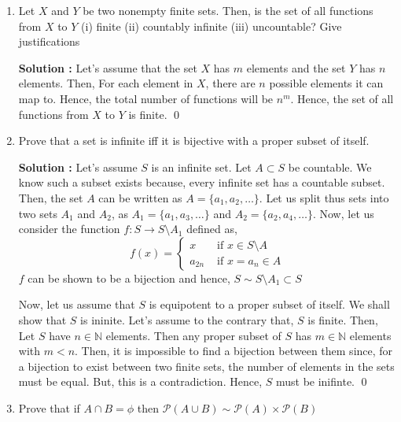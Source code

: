 \documentclass[10pt]{article}
\newcommand{\nn}{\mathbb{N}}
\newcommand{\p}{\mathcal{P}}
\begin{document}
\begin{enumerate}
	    Then, the collection of all decreasing functions from $\nn$ to $\nn$
	    $$ A = \bigcup_{n \in \nn}A_n$$
	    is the countable of union of countable sets and hence countable. \qed


    \item Let $X$ and $Y$ be two nonempty finite sets. Then, is the set of all functions from $X$ to $Y$ (i) finite (ii) countably infinite (iii) uncountable? Give justifications

	    \textbf{Solution : }Let's assume that the set $X$ has $m$ elements and the set $Y$ has $n$ elements. Then, For each element in $X$, there are $n$ possible elements it can map to. Hence, the total number of functions will be $n^m$. Hence, the set of all functions from $X$ to $Y$ is finite. \qed
    \item Prove that a set is infinite iff it is bijective with a proper subset of itself.

	    \textbf{Solution : }Let's assume $S$ is an infinite set. Let $A \subset S$ be countable.
	    We know such a subset exists because, every infinite set has a countable subset. Then,
	    the set $A$ can be written as $A = \{ a_1, a_2, \dots \}$. Let us split thus sets into two sets $A_1$ and $A_2$, as
	    $A_1 = \{ a_1, a_3, \dots \}$ and $A_2 = \{ a_2, a_4, \dots \}$. Now, let us consider the function $f: S \to S \setminus A_1$ defined as,
	    \begin{equation*}
		    f(x) = 
		    \begin{cases}
			    x & \text{ if } x \in S \setminus A \\
			    a_{2n} & \text{ if } x = a_n \in A
		    \end{cases}
	    \end{equation*}
	    $f$ can be shown to be a bijection and hence, $S \sim S\setminus A_1 \subset S$

	    Now, let us assume that $S$ is equipotent to a proper subset of itself. We shall show that
	    $S$ is ininite. Let's assume to the contrary that, $S$ is finite. Then, Let $S$ have $n \in \nn$ elements. Then
	    any proper subset of $S$ has $m \in \nn$ elements with $m < n$. Then, it is impossible to find a bijection between them
	    since, for a bijection to exist between two finite sets, the number of elements in the sets must be equal. But, this is a contradiction.
	    Hence, $S$ must be inifinte. \qed


    \item Prove that if $A \cap B = \phi$ then $\p(A \cup B) \sim \p(A) \times \p(B)$


\end{enumerate}
\end{document}
